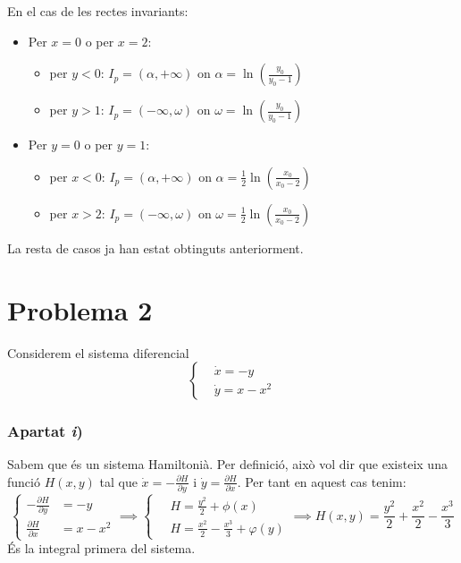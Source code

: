 \documentclass[10pt,a4paper]{article}
\begin{document}
En el cas de les rectes invariants:
\begin{itemize}
  \item Per $x=0$ o per $x=2$:
        \begin{itemize}
          \item per $y<0$: $I_p=(\alpha, +\infty)$ on $\alpha=\ln\left(\frac{y_0}{y_0-1}\right)$
          \item per $y>1$: $I_p=(-\infty, \omega)$ on $\omega=\ln\left(\frac{y_0}{y_0-1}\right)$
        \end{itemize}
  \item Per $y=0$ o per $y=1$:
        \begin{itemize}
          \item per $x<0$: $I_p=(\alpha, +\infty)$ on $\alpha=\frac{1}{2}\ln\left(\frac{x_0}{x_0-2}\right)$
          \item per $x>2$: $I_p=(-\infty, \omega)$ on $\omega=\frac{1}{2}\ln\left(\frac{x_0}{x_0-2}\right)$
        \end{itemize}
\end{itemize}

La resta de casos ja han estat obtinguts anteriorment.
\newpage
\section*{Problema 2}
Considerem el sistema diferencial
\begin{equation}\label{sistex2}
  \left\lbrace \begin{aligned}
     & \dot{x}=-y    \\
     & \dot{y}=x-x^2
  \end{aligned}\right.
\end{equation}
\subsubsection*{Apartat \emph{i})}
Sabem que és un sistema Hamiltonià. Per definició, això vol dir que existeix una funció $H(x,y)$ tal que $\displaystyle \dot{x}=-\frac{\partial H}{\partial y} \text{ i }\dot{y}=\frac{\partial H}{\partial x}$. Per tant en aquest cas tenim:
$$\left\lbrace \begin{aligned}
    -\frac{\partial H}{\partial y} & =-y    \\
    \frac{\partial H}{\partial x}  & =x-x^2
  \end{aligned}\right.\implies\left\lbrace \begin{aligned}
     & H=\frac{y^2}{2}+\phi(x)                  \\\
     & H=\frac{x^2}{2}-\frac{x^3}{3}+\varphi(y)
  \end{aligned}\right.\implies \boxed{H(x,y)=\frac{y^2}{2}+\frac{x^2}{2}-\frac{x^3}{3}}$$
És la integral primera del sistema.
\end{document}

